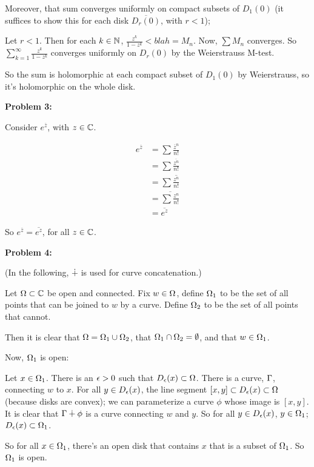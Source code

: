 \documentclass[a4paper,12pt]{article}
\begin{document}
Moreover, that sum converges uniformly on compact subsets of $D_1(0)$ (it suffices to show this for each disk $\overline{D_r(0)}$, with $r<1$);

\tab Let $r<1$. Then for each $k \in \mathbb{N}$, $\frac{z^k}{1-z^k} < blah = M_n$. Now, $\sum M_n$ converges. So $\sum\limits_{k=1}^\infty \frac{z^k}{1-z^k}$ converges uniformly on $D_r(0)$ by the Weierstrauss M-test.  %

So the sum is holomorphic at each compact subset of $D_1(0)$ by Weierstrauss, so it's holomorphic on the whole disk.

\shunt

{\bf Problem 3:}

Consider $e^{\overline{z}}$, with $z \in \mathbb{C}$.

\begin{align*}
e^{\overline{z}} &= \sum \frac{\overline{z}^n}{n!} \\
&= \sum \frac{\overline{z^n}}{n!}\\
&= \sum \overline{\frac{z^n}{n!}}\\
&= \overline{\sum\frac{z^n}{n!}}\\
&= \overline{e^z}
\end{align*}

So $e^{\overline{z}} = \overline{e^z}$, for all $z \in \mathbb{C}$.

\shunt

{\bf Problem 4:}

(In the following, $\dotplus$ is used for curve concatenation.)

Let $\Omega \subset \mathbb{C}$ be open and connected. Fix $w \in \Omega$, define $\Omega_1$ to be the set of all points that can be joined to $w$ by a curve. Define $\Omega_2$ to be the set of all points that cannot.

Then it is clear that $\Omega=\Omega_1 \cup \Omega_2$, that $\Omega_1 \cap \Omega_2 = \emptyset$, and that $w \in \Omega_1$.

Now, $\Omega_1$ is open:

\tab Let $x \in \Omega_1$. There is an $\epsilon>0$ such that $D_\epsilon(x) \subset \Omega$. There is a curve, $\Gamma$, connecting $w$ to $x$. For all $y \in D_\epsilon(x)$, the line segment $[x,y] \subset D_\epsilon(x) \subset \Omega$ (because disks are convex); we can parameterize a curve $\phi$ whose image is $[x,y]$. It is clear that $\Gamma \dotplus \phi$ is a curve connecting $w$ and $y$. So for all $y \in D_\epsilon(x)$, $y \in \Omega_1$; $D_\epsilon(x) \subset \Omega_1$.

\tab So for all $x \in \Omega_1$, there's an open disk that contains $x$ that is a subset of $\Omega_1$. So $\Omega_1$ is open.
\end{document}
